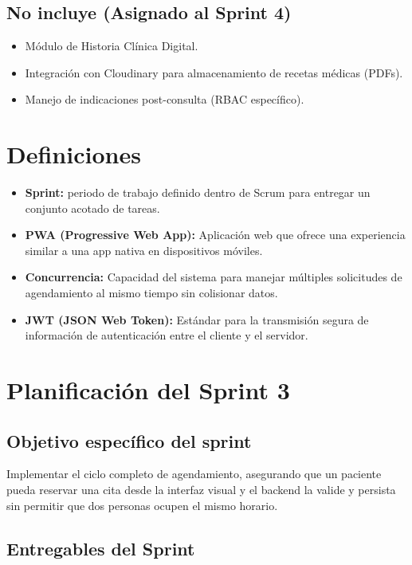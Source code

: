 \documentclass[a4paper,12pt]{article}
\begin{document}
\subsection{No incluye (Asignado al Sprint 4)}
\begin{itemize}
    \item Módulo de Historia Clínica Digital.
    \item Integración con Cloudinary para almacenamiento de recetas médicas (PDFs).
    \item Manejo de indicaciones post-consulta (RBAC específico).
\end{itemize}

\section{Definiciones}
\begin{itemize}
    \item \textbf{Sprint:} periodo de trabajo definido dentro de Scrum para entregar un conjunto acotado de tareas.
    \item \textbf{PWA (Progressive Web App):} Aplicación web que ofrece una experiencia similar a una app nativa en dispositivos móviles.
    \item \textbf{Concurrencia:} Capacidad del sistema para manejar múltiples solicitudes de agendamiento al mismo tiempo sin colisionar datos.
    \item \textbf{JWT (JSON Web Token):} Estándar para la transmisión segura de información de autenticación entre el cliente y el servidor.
\end{itemize}

\section{Planificación del Sprint 3}

\subsection{Objetivo específico del sprint}
Implementar el ciclo completo de agendamiento, asegurando que un paciente pueda reservar una cita desde la interfaz visual y el backend la valide y persista sin permitir que dos personas ocupen el mismo horario.

\subsection{Entregables del Sprint}
\end{document}
